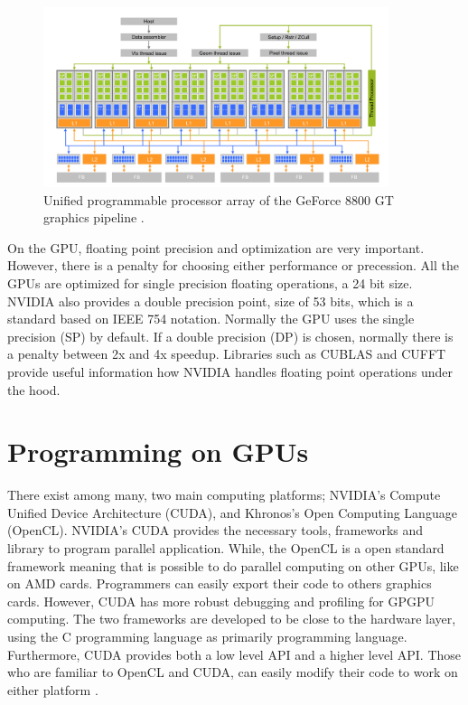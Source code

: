 \begin{figure}[htbp]
	\centering
		\includegraphics[width=0.9\textwidth]{Figures/arch.png}
		\smallskip
	\caption[NVIDIA's GPU architecture]{Unified programmable processor array of the GeForce 8800 GT graphics pipeline \cite{hwu}.}
	\label{fig:arch}
\end{figure}

On the GPU, floating point precision and optimization are very important. However, there is a penalty for choosing either performance or precession. All the GPUs are optimized for single precision floating operations, a 24 bit size. NVIDIA also provides a double precision point, size of 53 bits, which is a standard based on  IEEE 754 notation. Normally the GPU uses the single precision (SP) by default. If a double precision (DP) is chosen, normally there is a penalty between 2x and 4x speedup\cite{precision}. Libraries such as CUBLAS and CUFFT provide useful information how NVIDIA handles floating point operations under the hood.

\section{Programming on GPUs}

There exist among many, two main computing platforms; NVIDIA's Compute Unified Device Architecture (CUDA), and Khronos's Open Computing Language (OpenCL). NVIDIA's CUDA provides the necessary tools, frameworks and library to program parallel application. While, the OpenCL is a open standard framework meaning that is possible to do parallel computing on other GPUs, like on AMD cards. Programmers can easily export their code to others graphics cards.  However, CUDA has more robust debugging and profiling for GPGPU computing. The two frameworks are developed to be close to the hardware layer, using the C programming language as primarily programming language. Furthermore, CUDA provides both a low level API and a higher level API. Those who are familiar to OpenCL and CUDA, can easily modify their code to work on either platform \cite{hwu}.

